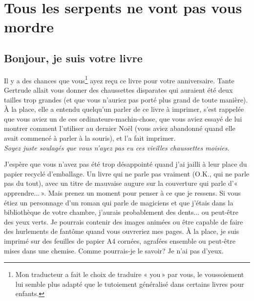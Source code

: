 


\mainmatter
\clearemptydoublepage
\chapter{Tous les serpents ne vont pas vous mor\-dre}
\section{Bonjour, je suis votre livre}
Il y a des chances que vous\footnote{Mon traducteur a fait le choix de traduire « you » par vous, le voussoiement lui semble plus adapté que le tutoiement généralisé dans certains livres pour enfants.} ayez reçu ce livre pour votre anniversaire. Tante Gertrude allait vous donner des chaussettes disparates qui auraient été deux tailles trop grandes (et que vous n'auriez pas porté plus grand de toute manière). À la place, elle a entendu quelqu'un parler de ce livre à imprimer, s'est rappelée que vous aviez un de ces ordinateurs-machin-chose, que vous aviez essayé de lui montrer comment l'utiliser au dernier Noël (vous aviez abandonné quand elle avait commencé à parler à la souris), et l'a fait imprimer.
\\


\emph{Soyez juste soulagés que vous n'ayez pas eu ces vieilles chaussettes moisies.\\}


J'espère que vous n'avez pas été trop désappointé quand j'ai jailli à leur place du papier recyclé d'emballage.
Un livre qui ne parle pas vraiment (O.K., qui ne parle pas du tout), avec un titre de mauvaise augure sur la couverture 
qui parle d'« apprendre... ». Mais prenez un moment pour penser à ce que je ressens. Si vous étiez un personnage d'un roman qui parle de magiciens et que j'étais dans la bibliothèque de votre chambre, j'aurais probablement des dents... ou peut-être des yeux verts. Je pourrais contenir des images animées ou être capable de faire des hurlements de fantôme quand vous ouvreriez mes pages. À la place, je suis imprimé sur des feuilles de papier A4 cornées, agrafées ensemble ou peut-être mises dans une chemise. Comme pourrais-je le savoir? Je n'ai pas d'yeux.\\


